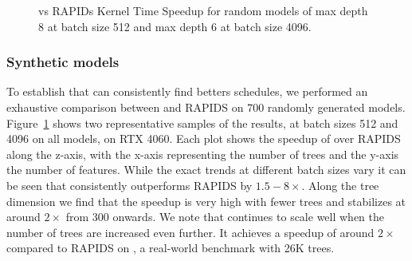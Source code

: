 \begin{figure}[htb]
\begin{minipage}[t]{.475\linewidth}
  \end{minipage}
  \caption{\label{fig:randomModels4060}\Treebeard{} vs RAPIDs Kernel Time Speedup for random models
  of max depth 8 at batch size 512 and max depth 6 at batch size 4096.}
\end{figure}

\subsubsection*{Synthetic models}
To establish that \Treebeard{} can consistently find betters schedules, we performed an exhaustive comparison between \Treebeard{} and RAPIDS on 700 randomly generated models.   
Figure~\ref{fig:randomModels4060} shows two representative samples of the results, at batch sizes 512 and 4096 on all models, on RTX 4060. 
Each plot shows the speedup of \Treebeard{} over RAPIDS along the z-axis, with the x-axis representing the number of trees and the y-axis the number of features. 
While the exact trends at different batch sizes vary it can be seen that \Treebeard{} consistently outperforms RAPIDS by $1.5-8\times$. Along the tree 
dimension we find that the speedup is very high with fewer trees and stabilizes at around $2\times$ from 300 onwards. We note that \Treebeard{} continues to scale well 
when the number of trees are increased even further. It achieves a speedup of around $2\times$ compared to RAPIDS on , a real-world benchmark
with 26K trees.
